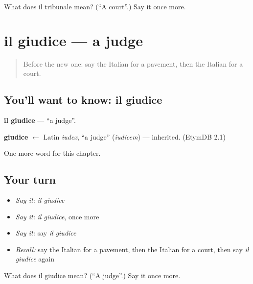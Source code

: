 \begin{tcolorbox}[breakable,colback=teal!4,colframe=teal!35!black,title={Before you move on}]
What does il tribunale mean? (\textquotedblleft{}A court\textquotedblright{}.) Say it once more.
\end{tcolorbox}
\section[il giudice]{il giudice — a judge}

\label{lesson:IT-C161-giudice}



\begin{quote}
Before the new one: say the Italian for a pavement, then the Italian for a court.
\end{quote}

\subsection*{You'll want to know: il giudice}
\textbf{il giudice} — \textquotedblleft{}a judge\textquotedblright{}.

\begin{cousinweb}
\textbf{giudice} $\leftarrow$ Latin \emph{iudex}, \textquotedblleft{}a judge\textquotedblright{} (\emph{iudicem}) — inherited. (EtymDB 2.1)
\end{cousinweb}

\begin{grammarlens}[title={What you've built}]
One more word for this chapter.
\end{grammarlens}

\subsection*{Your turn}
\begin{itemize}
\raggedright
  \item \emph{Say it:} \emph{il giudice}
  \item \emph{Say it:} \emph{il giudice}, once more
  \item \emph{Say it:} say \emph{il giudice}
  \item \emph{Recall:} say the Italian for a pavement, then the Italian for a court, then say \emph{il giudice} again
\end{itemize}

\begin{tcolorbox}[breakable,colback=teal!4,colframe=teal!35!black,title={Before you move on}]
What does il giudice mean? (\textquotedblleft{}A judge\textquotedblright{}.) Say it once more.
\end{tcolorbox}
